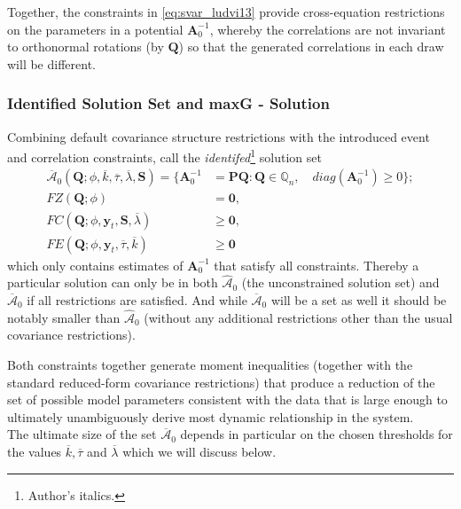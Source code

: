 \documentclass[a4paper,11pt,listof=nochaptergap,oneside,pointednumbers,bibtotoc,bigheadings,liststotoc]{scrbook}
\theoremstyle{mysatz}
\theoremstyle{mydefinition}
\theoremstyle{mytheorem}
\theoremstyle{mybemerkung}
\let\oldhat\hat
\newcommand{\vect}[1]{\boldsymbol{\mathbf{#1}}}
\newcommand{\hatt}[1]{\oldhat{\boldsymbol{\mathbf{#1}}}}
\begin{document}
Together, the constraints in \ref{eq:svar_ludvi13} provide cross-equation restrictions on the parameters in a potential $\vect{A}_0^{-1}$, whereby the correlations are not invariant to orthonormal rotations (by $\vect{Q}$) so that the generated correlations in each draw will be different. 

\subsubsection{Identified Solution Set and maxG - Solution}
Combining default covariance structure restrictions with the introduced event and correlation constraints, \citet{ludvigsonetal:18} call the \textit{identifed}\footnote{Author's italics.} solution set 
\begin{equation} \label{eq:svar_ludvi14}
\begin{split}
\overline{\vect{\mathcal{A}}}_0(\vect{Q}; \phi, \overline{k}, \overline{\tau}, \overline{\lambda}, \vect{S})  = \{\vect{A}_0^{-1} & = \vect{P}\vect{Q}: \vect{Q} \in \mathbb{Q}_n, \quad diag(\vect{A}_0^{-1}) \geq 0\}; \\
			FZ(\vect{Q}; \phi) & = \vect{0}, \\
			FC(\vect{Q}; \phi, \vect{y}_t, \vect{S}, \overline{\lambda}) & \geq \vect{0}, \\
			FE(\vect{Q}; \phi, \vect{y}_t, \overline{\tau}, \overline{k}) & \geq \vect{0}
\end{split}								
\end{equation}
which only contains estimates of $\vect{A}_0^{-1}$ that satisfy all constraints. Thereby a particular solution can only be in both $\hatt{\mathcal{A}}_0$ (the unconstrained solution set) and $\overline{\vect{\mathcal{A}}}_0$ if all restrictions are satisfied. And while $\overline{\vect{\mathcal{A}}}_0$ will be a set as well it should be notably smaller than $\hatt{\mathcal{A}}_0$ (without any additional restrictions other than the usual covariance restrictions).

Both constraints together generate moment inequalities (together with the standard reduced-form covariance restrictions) that produce a reduction of the set of possible model parameters consistent with the data that is large enough to ultimately unambiguously derive most dynamic relationship in the system.\\

The ultimate size of the set $\overline{\vect{\mathcal{A}}}_0$ depends in particular on the chosen thresholds for the values $\overline{k}, \overline{\tau}$ and $\overline{\lambda}$ which we will discuss below.
\end{document}
